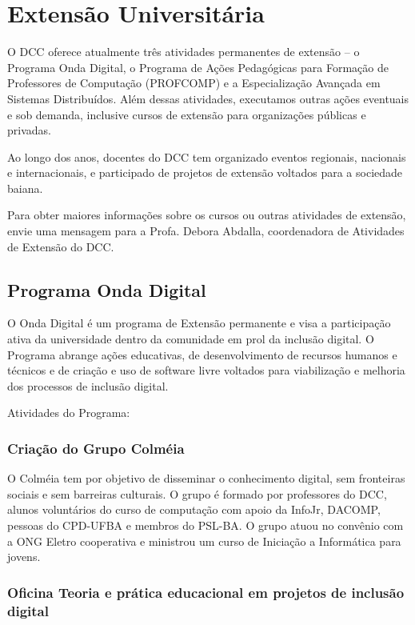 \chapter{Extensão Universitária}

O DCC oferece atualmente três atividades permanentes de extensão -- o Programa Onda Digital, o Programa de Ações Pedagógicas para Formação de Professores de Computação (PROFCOMP) e a Especialização Avançada em Sistemas Distribuídos. Além dessas atividades, executamos outras ações eventuais e sob demanda, inclusive cursos de extensão para organizações públicas e privadas. 
      
      Ao longo dos anos, docentes do DCC tem organizado eventos regionais, nacionais e internacionais, e participado de projetos de extensão voltados para a sociedade baiana. 
      
      Para obter maiores informações sobre os cursos ou outras atividades de extensão, envie uma mensagem para a Profa. Debora Abdalla, coordenadora de Atividades de Extensão do DCC. 

\section{Programa Onda Digital}

O Onda Digital é um programa de Extensão permanente e visa a participação ativa da universidade dentro da comunidade em prol da inclusão digital. O Programa abrange ações educativas, de desenvolvimento de recursos humanos e técnicos e de criação e uso de software livre voltados para viabilização e melhoria dos processos de inclusão digital.
      
Atividades do Programa: 
       
\subsection{Criação do Grupo Colméia} 
       O Colméia tem por objetivo de disseminar o conhecimento digital, sem fronteiras sociais e sem barreiras culturais. O grupo é formado por professores do DCC, alunos voluntários do curso de computação com apoio da InfoJr, DACOMP, pessoas do CPD-UFBA e membros do PSL-BA. O grupo atuou no convênio com a ONG Eletro cooperativa e ministrou um curso de Iniciação a Informática para jovens.
       
\subsection{Oficina Teoria e prática educacional em projetos de inclusão digital}
       
